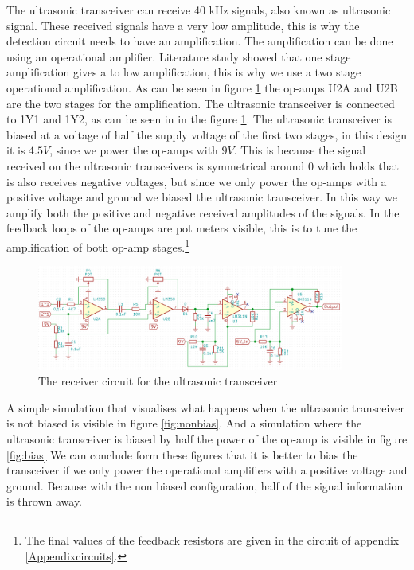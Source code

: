 The ultrasonic transceiver can receive 40 kHz signals, also known as ultrasonic signal. These received signals have a very low amplitude, this is why the detection circuit needs to have an amplification. The amplification can be done using an operational amplifier. Literature study showed that one stage amplification gives a to low amplification, this is why we use a two stage operational amplification. As can be seen in figure \ref{fig:receivecircuit} the op-amps U2A and U2B are the two stages for the amplification.
The ultrasonic transceiver is connected to 1Y1 and 1Y2, as can be seen in in the figure \ref{fig:receivecircuit}. The ultrasonic transceiver is biased at a voltage of half the supply voltage of the first two stages, in this design it is $4.5V$, since we power the op-amps with $9V$. This is because the signal received on the ultrasonic transceivers is symmetrical around 0 which holds that is also receives negative voltages, but since we only power the op-amps with a positive voltage and ground we biased the ultrasonic transceiver. In this way we amplify both the positive and negative received amplitudes of the signals.
In the feedback loops of the op-amps are pot meters visible, this is to tune the amplification of both op-amp stages.\footnote{The final values of the feedback resistors are given in the circuit of appendix \ref{Appendixcircuits}.}

\begin{figure}[H]
\centering
\includegraphics[width=0.9\textwidth]{Figures/receivercircuit.PNG}
\caption{The receiver circuit for the ultrasonic transceiver}
\label{fig:receivecircuit}
\end{figure}

A simple simulation that visualises what happens when the ultrasonic transceiver is not biased is visible in figure \ref{fig:nonbias}.
And a simulation where the ultrasonic transceiver is biased by half the power of the op-amp is visible in figure \ref{fig:bias}
We can conclude form these figures that it is better to bias the transceiver if we only power the operational amplifiers with a positive voltage and ground. Because with the non biased configuration, half of the signal information is thrown away.

